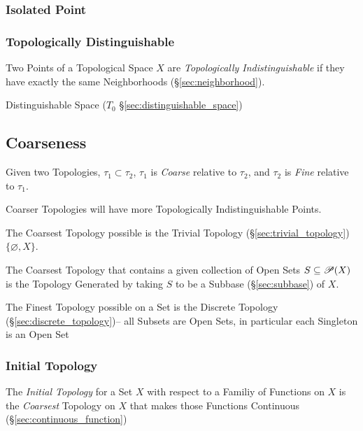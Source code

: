 \subsubsection{Isolated Point}\label{sec:isolated_point}

\subsubsection{Topologically Distinguishable}
\label{sec:topologically_distinguishable}

Two Points of a Topological Space $X$ are \emph{Topologically
  Indistinguishable} if they have exactly the same Neighborhoods
(\S\ref{sec:neighborhood}).

\fist Distinguishable Space ($T_0$ \S\ref{sec:distinguishable_space})



\subsection{Coarseness}\label{sec:coarseness}

Given two Topologies, $\tau_1 \subset \tau_2$, $\tau_1$ is
\emph{Coarse} relative to $\tau_2$, and $\tau_2$ is \emph{Fine}
relative to $\tau_1$.

Coarser Topologies will have more Topologically Indistinguishable
Points.

The Coarsest Topology possible is the Trivial Topology
(\S\ref{sec:trivial_topology}) $\{ \varnothing, X \}$.

The Coarsest Topology that contains a given collection of Open Sets $S
\subseteq \mathscr{P}(X)$ is the Topology Generated by taking $S$ to
be a Subbase (\S\ref{sec:subbase}) of $X$.

The Finest Topology possible on a Set is the Discrete Topology
(\S\ref{sec:discrete_topology})-- all Subsets are Open Sets, in particular each
Singleton is an Open Set



\subsubsection{Initial Topology}\label{sec:initial_topology}

The \emph{Initial Topology} for a Set $X$ with respect to a Familiy of
Functions on $X$ is the \emph{Coarsest} Topology on $X$ that makes those
Functions Continuous (\S\ref{sec:continuous_function})

